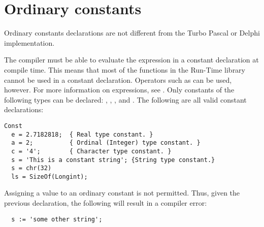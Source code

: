 \section{Ordinary constants}
Ordinary constants declarations are not different from the Turbo Pascal or
Delphi implementation.

The compiler must be able to evaluate the expression in a constant
declaration at compile time.  This means that most of the functions
in the Run-Time library cannot be used in a constant declaration.
Operators such as  can be used, however. For more information on expressions, see
.
Only constants of the following types can be declared: ,
, , and .
The following are all valid constant declarations:
\begin{verbatim}
Const
  e = 2.7182818;  { Real type constant. }
  a = 2;          { Ordinal (Integer) type constant. }
  c = '4';        { Character type constant. }
  s = 'This is a constant string'; {String type constant.}
  s = chr(32)
  ls = SizeOf(Longint);
\end{verbatim}
Assigning a value to an ordinary constant is not permitted.
Thus, given the previous declaration, the following will result
in a compiler error:
\begin{verbatim}
  s := 'some other string';
\end{verbatim}

